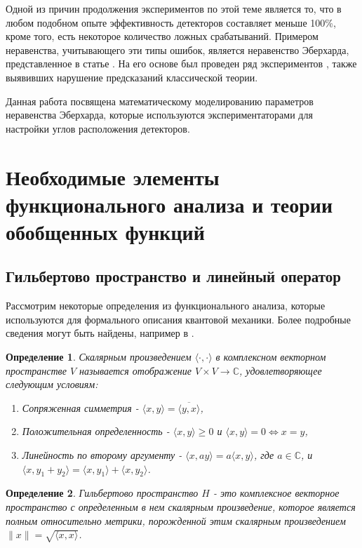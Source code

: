 \documentclass[11pt]{article}
\newtheorem{definition}{Определение}[section]
\begin{document}
Одной из причин продолжения экспериментов по этой теме является то, что в любом подобном опыте эффективность детекторов составляет меньше 100\%, кроме того, есть некоторое количество ложных срабатываний. Примером неравенства, учитывающего эти типы ошибок, является неравенство Эберхарда, представленное в статье \cite{Eberhard}. На его основе был проведен ряд экспериментов \cite{Zeilinger}, также выявивших нарушение предсказаний классической теории.

Данная работа посвящена математическому моделированию параметров неравенства Эберхарда, которые используются экспериментаторами для настройки углов расположения детекторов.

\section{Необходимые элементы функционального анализа и теории обобщенных функций}
\subsection{Гильбертово пространство и линейный оператор}
Рассмотрим некоторые определения из функционального анализа, которые используются для формального описания квантовой механики. Более подробные сведения могут быть найдены, например в \cite{advanced_la}.


\begin{definition}
Скалярным произведением $\langle\cdot,\cdot\rangle$ в комплексном векторном пространстве $V$ называется отображение $V\times V \to \mathbb{C}$, удовлетворяющее следующим условиям:
\begin{enumerate}
\item Сопряженная симметрия - $\langle x, y\rangle = \overline{\langle y, x\rangle}$,
\item Положительная определенность - $\langle x, y\rangle \geq 0$ и $\langle x, y\rangle = 0 \Leftrightarrow x = y$,
\item Линейность по второму аргументу - $\langle x, ay\rangle = a\langle x, y\rangle$, где $a\in\mathbb{C}$, и $\langle x, y_1 + y_2\rangle = \langle x, y_1\rangle + \langle x, y_2\rangle$.
\end{enumerate}
\end{definition}

\begin{definition}
Гильбертово пространство $H$ - это комплексное векторное пространство с определенным в нем скалярным произведение, которое является полным относительно метрики, порожденной этим скалярным произведением $\|x\| = \sqrt{\langle x, x\rangle}$.
\end{definition}
\end{document}
